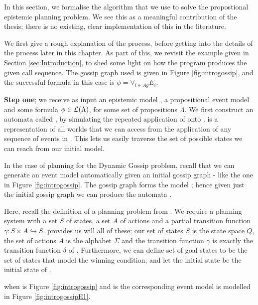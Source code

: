 \documentclass[10pt, a4paper]{report}
\begin{document}
In this section, we formalise the algorithm that we use to solve the
propostional epistemic planning problem. We see this as a meaningful
contribution of the thesis; there is no existing, clear implementation of this
in the literature.

We first give a rough explanation of the process, before getting into the
details of the process later in this chapter. As part of this, we revisit the
example given in Section \ref{sec:Introduction}, to shed some light on how the
program produces the given call sequence. The gossip graph used is given in
Figure \ref{fig:introgossip}, and the successful formula in this case is $\phi =
\forall_{i \in Ag} E_i$. 

\textbf{Step one}; we receive as input an epistemic model , a
propositional event model  and some formula $\phi \in \mathcal{L}(\Lambda)$,
for some set of propositions $\Lambda$. We first construct an automata called
\mestar, by simulating the repeated application of  onto . \mestar
is a representation of all worlds that we can access from the application of any
sequence of events in . This lets us easily traverse the set of possible
states we can reach from our initial model.

In the case of planning for the Dynamic Gossip problem, recall that we can
generate an event model  automatically given an initial gossip graph -
like the one in Figure \ref{fig:introgossip}. The gossip graph forms the model
; hence given just the initial gossip graph we can produce the automata
\mestar.

Here, recall the definition of a planning problem from . We
require a planning system with a set $S$ of states, a set $A$ of actions and a
partial transition function $\gamma : S \times A \hookrightarrow S$. \mestar
provides us will all of these; our set of states $S$ is the state space $Q$, the
set of actions $A$ is the alphabet $\Sigma$ and the transition function $\gamma$
is exactly the transition function $\delta$ of \mestar. Furthermore, we can
define set of goal states to be the set of states that model the winning
condition, and let the initial state be the initial state of \mestar.

\mestar when  is Figure \ref{fig:introgossip} and  is the
corresponding event model is modelled in Figure \ref{fig:introgossipE1}.
\end{document}
